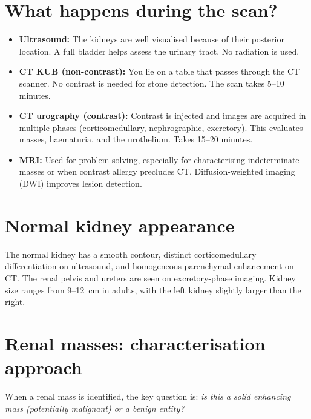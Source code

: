 \section{What happens during the scan?}
\begin{itemize}
    \item \textbf{Ultrasound:} The kidneys are well visualised because of their posterior location. A full bladder helps assess the urinary tract. No radiation is used.
    \item \textbf{CT KUB (non-contrast):} You lie on a table that passes through the CT scanner. No contrast is needed for stone detection. The scan takes 5--10 minutes.
    \item \textbf{CT urography (contrast):} Contrast is injected and images are acquired in multiple phases (corticomedullary, nephrographic, excretory). This evaluates masses, haematuria, and the urothelium. Takes 15--20 minutes.
    \item \textbf{MRI:} Used for problem-solving, especially for characterising indeterminate masses or when contrast allergy precludes CT. Diffusion-weighted imaging (DWI) improves lesion detection.
\end{itemize}

\section{Normal kidney appearance}
The normal kidney has a smooth contour, distinct corticomedullary differentiation on ultrasound, and homogeneous parenchymal enhancement on CT. The renal pelvis and ureters are seen on excretory-phase imaging. Kidney size ranges from 9--12~cm in adults, with the left kidney slightly larger than the right.

\section{Renal masses: characterisation approach}
When a renal mass is identified, the key question is: \emph{is this a solid enhancing mass (potentially malignant) or a benign entity?}

